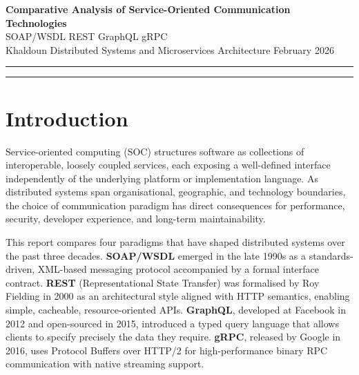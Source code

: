 \documentclass[11pt,a4paper]{article}
\begin{document}

\begin{center}
  {\large\bfseries Comparative Analysis of Service-Oriented Communication Technologies}\\[0.3em]
  {\normalsize SOAP/WSDL \quad\textemdash\quad REST \quad\textemdash\quad
   GraphQL \quad\textemdash\quad gRPC}\\[0.25em]
  {\small Khaldoun \quad\textbar\quad
   Distributed Systems and Microservices Architecture \quad\textbar\quad
   February 2026}
\end{center}
\vspace{0.2em}
\noindent\rule{\linewidth}{0.5pt}
\vspace{-0.8em}

\setcounter{tocdepth}{2}
\tableofcontents

\vspace{0.5em}
\noindent\rule{\linewidth}{0.3pt}
\vspace{0.3em}

\section{Introduction}

Service-oriented computing (SOC) structures software as collections of interoperable,
loosely coupled services, each exposing a well-defined interface independently of the
underlying platform or implementation language. As distributed systems span
organisational, geographic, and technology boundaries, the choice of communication
paradigm has direct consequences for performance, security, developer experience, and
long-term maintainability.

This report compares four paradigms that have shaped distributed systems over the past
three decades. \textbf{SOAP/WSDL} emerged in the late 1990s as a standards-driven,
XML-based messaging protocol accompanied by a formal interface contract. \textbf{REST}
(Representational State Transfer) was formalised by Roy Fielding in 2000 as an
architectural style aligned with HTTP semantics, enabling simple, cacheable,
resource-oriented APIs. \textbf{GraphQL}, developed at Facebook in 2012 and open-sourced
in 2015, introduced a typed query language that allows clients to specify precisely the
data they require. \textbf{gRPC}, released by Google in 2016, uses Protocol Buffers over
HTTP/2 for high-performance binary RPC communication with native streaming support.
\end{document}
